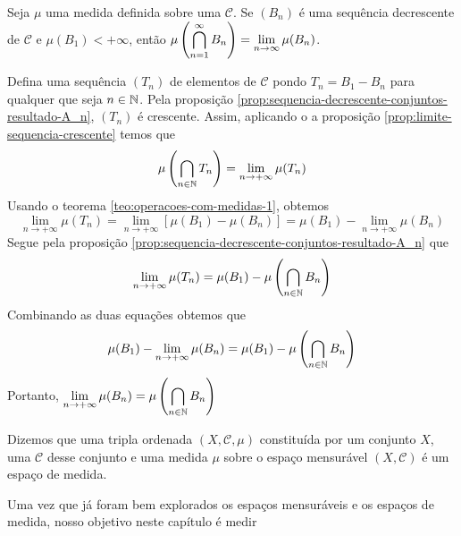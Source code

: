 \begin{proposition}
Seja $\mu$ uma medida definida sobre uma \sigal $\mathcal{C}$.
Se $(B_n)$ é uma sequência decrescente de $\mathcal{C}$ e $\mu(B_1) < +\infty$, então 
$\mu\left(\displaystyle \bigcap_{n = 1}^\infty B_n\right) = \displaystyle \lim_{n \to \infty} \mu(B_n)$.
\end{proposition} 
\begin{prova}
    Defina uma sequência $(T_n)$ de elementos de $\mathcal{C}$ pondo $T_n = B_1 - B_n$ para qualquer que seja $n \in \operatorname{\mathbb{N}}$.
    Pela proposição \ref{prop:sequencia-decrescente-conjuntos-resultado-A_n}, $(T_n)$ é crescente.
    Assim, aplicando o a proposição \ref{prop:limite-sequencia-crescente} temos que 
    $$
    \mu\left(\bigcap_{n \in \operatorname{\mathbb{N}}} T_n\right) = \lim_{n \to +\infty} \mu(T_n)
    $$
    Usando o teorema \ref{teo:operacoes-com-medidas-1}, obtemos
    $$
    \lim_{n \to +\infty} \mu(T_n) = \lim_{n \to +\infty} [\mu(B_1) - \mu(B_n)] = \mu(B_1) - \lim_{n \to +\infty} \mu(B_n)
    $$
    Segue pela proposição \ref{prop:sequencia-decrescente-conjuntos-resultado-A_n} que 
    $$
    \lim_{n \to +\infty} \mu(T_n) = \mu(B_1) - \mu\left(\bigcap_{n \in \operatorname{\mathbb{N}}} B_n\right)
    $$
    Combinando as duas equações obtemos que
    \begin{align*}
        \mu(B_1) - \lim_{n \to +\infty} \mu(B_n) = \mu(B_1) - \mu\left(\bigcap_{n \in \operatorname{\mathbb{N}}} B_n\right)
    \end{align*}
    Portanto, $\displaystyle \lim_{n \to +\infty} \mu(B_n) = \mu\left(\bigcap_{n \in \operatorname{\mathbb{N}}} B_n\right)$
\end{prova}


\begin{definition}
    Dizemos que uma tripla ordenada $(X, \mathcal{C}, \mu)$ constituída por um conjunto $X$, uma \sigal $\mathcal{C}$ desse conjunto e uma medida $\mu$ sobre o espaço mensurável $(X, \mathcal{C})$ é um espaço de medida.
\end{definition}

Uma vez que já foram bem explorados os espaços mensuráveis e os espaços de medida, nosso objetivo neste capítulo é medir 
